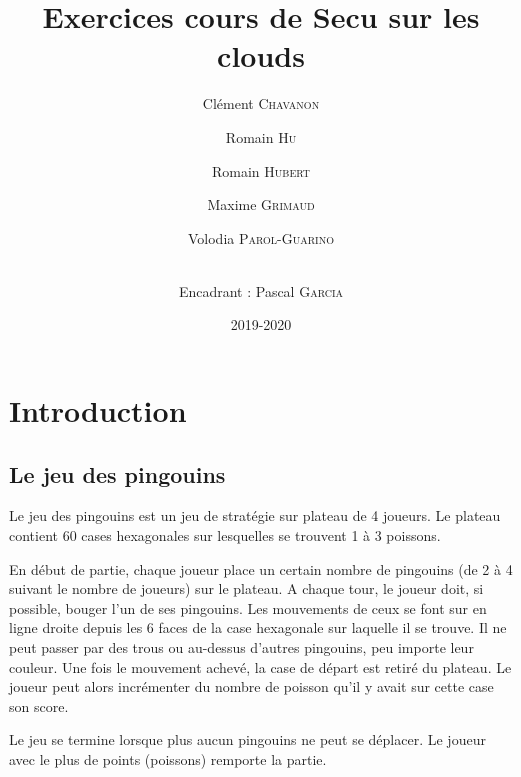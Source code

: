 \documentclass[a4paper,11pt]{article}
\title{\textbf{Exercices cours de Secu sur les clouds}}
\author{Clément \textsc{Chavanon} \and Romain \textsc{Hu} \and Romain
\textsc{Hubert} \and Maxime \textsc{Grimaud} \and Volodia
\textsc{Parol-Guarino} \and 
 \\ Encadrant : Pascal \textsc{Garcia}}
\date{2019-2020}
\begin{document}
\maketitle
\begin{abstract}

\end{abstract}

{
\tableofcontents
}
\hypertarget{introduction}{%
\section*{Introduction}\label{introduction}}

\hypertarget{le-jeu-des-pingouins}{%
\subsection{Le jeu des pingouins}\label{le-jeu-des-pingouins}}

Le jeu des pingouins est un jeu de stratégie sur plateau de 4 joueurs.
Le plateau contient 60 cases hexagonales sur lesquelles se trouvent 1 à
3 poissons.

En début de partie, chaque joueur place un certain nombre de pingouins
(de 2 à 4 suivant le nombre de joueurs) sur le plateau. A chaque tour,
le joueur doit, si possible, bouger l'un de ses pingouins. Les
mouvements de ceux se font sur en ligne droite depuis les 6 faces de la
case hexagonale sur laquelle il se trouve. Il ne peut passer par des
trous ou au-dessus d'autres pingouins, peu importe leur couleur. Une
fois le mouvement achevé, la case de départ est retiré du plateau. Le
joueur peut alors incrémenter du nombre de poisson qu'il y avait sur
cette case son score.

Le jeu se termine lorsque plus aucun pingouins ne peut se déplacer. Le
joueur avec le plus de points (poissons) remporte la partie.

% 

\end{document}
